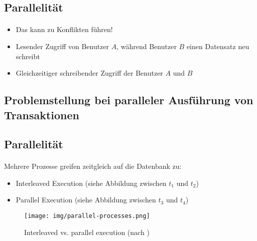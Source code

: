\subsection{Parallelität}
\begin{frame}{\insertsection}
\framesubtitle{\insertsubsection}
\begin{itemize}
	\item Das kann zu Konflikten führen!
	\item Lesender Zugriff von Benutzer $A$, während Benutzer $B$ einen Datensatz neu schreibt 
	\item Gleichzeitiger schreibender Zugriff der Benutzer $A$ und $B$
\end{itemize}
\pause\abs
{}
\end{frame}

\subsection{Problemstellung bei paralleler Ausführung von Transaktionen}

\subsection{Parallelität}
\begin{frame}{\insertsection}
\framesubtitle{\insertsubsection}
Mehrere Prozesse greifen zeitgleich auf die Datenbank zu: 
	\begin{itemize}
		\item Interleaved Execution (siehe Abbildung zwischen $t_1$ und $t_2$)
		\item Parallel Execution (siehe Abbildung zwischen $t_3$ und $t_4$)
	\end{itemize}
\begin{figure}
	\texttt{[image: img/parallel-processes.png]}
	\caption{Interleaved vs. parallel execution (nach \cite[S. 745]{EN10})}
\end{figure}
\end{frame}

